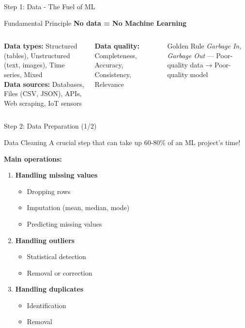 \documentclass[12pt,aspectratio=169]{beamer}
\begin{document}
\begin{frame}{Step 1: Data - The Fuel of ML}
\vspace{-0.3cm}

\begin{block}{Fundamental Principle}
\textbf{No data = No Machine Learning}
\end{block}

\vspace{0.3cm}

\begin{columns}[T]

\textbf{Data types:} Structured (tables), Unstructured (text, images), Time series, Mixed\\[0.2cm]
\textbf{Data sources:} Databases, Files (CSV, JSON), APIs, Web scraping, IoT sensors

\textbf{Data quality:} Completeness, Accuracy, Consistency, Relevance

\vspace{0.3cm}
\begin{alertblock}{Golden Rule}
\textit{Garbage In, Garbage Out} — Poor-quality data → Poor-quality model
\end{alertblock}

\end{columns}
\end{frame}




\begin{frame}{Step 2: Data Preparation (1/2)}
\begin{block}{Data Cleaning}
A crucial step that can take up 60-80\% of an ML project's time!
\end{block}

\textbf{Main operations:}

\begin{enumerate}
\item \textbf{Handling missing values}
\begin{itemize}
\item Dropping rows
\item Imputation (mean, median, mode)
\item Predicting missing values
\end{itemize}

\item \textbf{Handling outliers}
\begin{itemize}
\item Statistical detection
\item Removal or correction
\end{itemize}

\item \textbf{Handling duplicates}
\begin{itemize}
\item Identification
\item Removal
\end{itemize}
\end{enumerate}
\end{frame}
\end{document}
